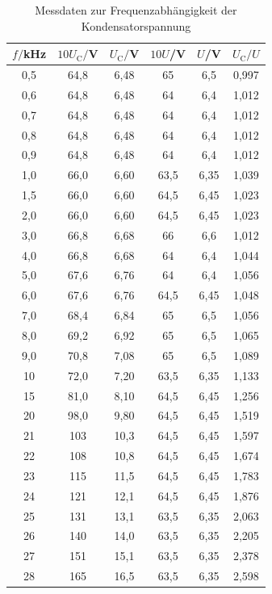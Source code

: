 \begin{table}
\centering
\caption{Messdaten zur Frequenzabhängigkeit der Kondensatorspannung}
\label{tab:amplitude1}
\begin{tabular}{c c c c c c}
\toprule
$f/$kHz & $10U_\mathrm{C}/$V & $U_\mathrm{C}/$V & $10U$/V & $U$/V & $U_\mathrm{C}/U$ \\
\midrule
  0,5	&  64,8  &  6,48 & 65   & 6,5 & 0,997 \\
  0,6	&  64,8  &  6,48 & 64   & 6,4 & 1,012 \\
  0,7	&  64,8  &  6,48 & 64   & 6,4 & 1,012 \\
  0,8	&  64,8  &  6,48 & 64   & 6,4 & 1,012 \\
  0,9	&  64,8  &  6,48 & 64   & 6,4 & 1,012 \\
  1,0 &  66,0	 &  6,60 & 63,5 & 6,35& 1,039 \\
  1,5	&  66,0	 &  6,60 & 64,5 & 6,45& 1,023 \\
  2,0 &  66,0	 &  6,60 & 64,5 & 6,45& 1,023 \\
  3,0 &  66,8	 &  6,68 & 66   & 6,6 & 1,012 \\
  4,0 &  66,8	 &  6,68 & 64   & 6,4 & 1,044 \\
  5,0 &  67,6	 &  6,76 & 64   & 6,4 & 1,056 \\
  6,0 &  67,6	 &  6,76 & 64,5 & 6,45& 1,048 \\
  7,0 &  68,4	 &  6,84 & 65   & 6,5 & 1,056 \\
  8,0	&  69,2	 &  6,92 & 65   & 6,5 & 1,065 \\
  9,0	&  70,8	 &  7,08 & 65   & 6,5 & 1,089 \\
 10	  &  72,0	 &  7,20 & 63,5 & 6,35& 1,133 \\
 15	  &  81,0	 &  8,10 & 64,5 & 6,45& 1,256 \\
 20	  &  98,0  &  9,80 & 64,5 & 6,45& 1,519 \\
 21	  & 103	   & 10,3  & 64,5 & 6,45& 1,597 \\
 22	  & 108	   & 10,8  & 64,5 & 6,45& 1,674 \\
 23	  & 115	   & 11,5  & 64,5 & 6,45& 1,783 \\
 24	  & 121	   & 12,1  & 64,5 & 6,45& 1,876 \\
 25	  & 131	   & 13,1  & 63,5 & 6,35& 2,063 \\
 26	  & 140	   & 14,0  & 63,5 & 6,35& 2,205 \\
 27	  & 151	   & 15,1  & 63,5 & 6,35& 2,378 \\
 28	  & 165	   & 16,5  & 63,5 & 6,35& 2,598 \\

\end{tabular}
\end{table}

